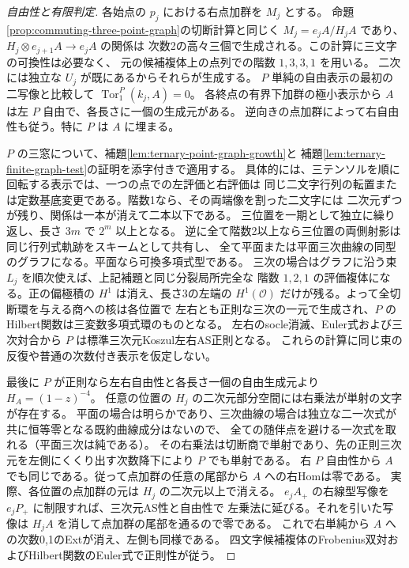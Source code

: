 \begin{proof}[自由性と有限判定]
各始点の $p_j$ における右点加群を $M_j$ とする。
命題\ref{prop:commuting-three-point-graph}の切断計算と同じく
$M_j=e_jA/H_jA$ であり、$H_j\otimes e_{j+1}A\to e_jA$ の関係は
次数2の高々三個で生成される。この計算に三文字の可換性は必要なく、
元の候補複体上の点列での階数 $1,3,3,1$ を用いる。
二次には独立な $U_j$ が既にあるからそれらが生成する。
$P$ 単純の自由表示の最初の二写像と比較して $\operatorname{Tor}^P_1(k_j,A)=0$。
各終点の有界下加群の極小表示から $A$ は左 $P$ 自由で、各長さに一個の生成元がある。
逆向きの点加群によって右自由性も従う。特に $P$ は $A$ に埋まる。

$P$ の三窓について、補題\ref{lem:ternary-point-graph-growth}と
補題\ref{lem:ternary-finite-graph-test}の証明を添字付きで適用する。
具体的には、三テンソルを順に回転する表示では、一つの点での左評価と右評価は
同じ二文字行列の転置または定数基底変更である。階数1なら、その両端像を割った二文字には
二次元ずつが残り、関係は一本が消えて二本以下である。
三位置を一期として独立に繰り返し、長さ $3m$ で $2^m$ 以上となる。
逆に全て階数2以上なら三位置の両側射影は同じ行列式軌跡をスキームとして共有し、
全て平面または平面三次曲線の同型のグラフになる。平面なら可換多項式型である。
三次の場合はグラフに沿う束 $L_j$ を順次使えば、上記補題と同じ分裂局所完全な
階数 $1,2,1$ の評価複体になる。正の偏極積の $H^1$ は消え、長さ3の左端の
$H^1(\mathcal O)$ だけが残る。よって全切断環を与える商への核は各位置で
左右とも正則な三次の一元で生成され、$P$ のHilbert関数は三変数多項式環のものとなる。
左右のsocle消滅、Euler式および三次対合から $P$ は標準三次元Koszul左右AS正則となる。
これらの計算に同じ束の反復や普通の次数付き表示を仮定しない。

最後に $P$ が正則なら左右自由性と各長さ一個の自由生成元より $H_A=(1-z)^{-4}$。
任意の位置の $H_j$ の二次元部分空間には右乗法が単射の文字が存在する。
平面の場合は明らかであり、三次曲線の場合は独立な二一次式が共に恒等零となる既約曲線成分はないので、
全ての随伴点を避ける一次式を取れる（平面三次は純である）。
その右乗法は切断商で単射であり、先の正則三次元を左側にくくり出す次数降下により $P$ でも単射である。
右 $P$ 自由性から $A$ でも同じである。従って点加群の任意の尾部から $A$ への右Homは零である。
実際、各位置の点加群の元は $H_j$ の二次元以上で消える。
$e_jA_+$ の右線型写像を $e_jP_+$ に制限すれば、三次元AS性と自由性で
左乗法に延びる。それを引いた写像は $H_jA$ を消して点加群の尾部を通るので零である。
これで右単純から $A$ への次数0,1のExtが消え、左側も同様である。
四文字候補複体のFrobenius双対およびHilbert関数のEuler式で正則性が従う。
\end{proof}

